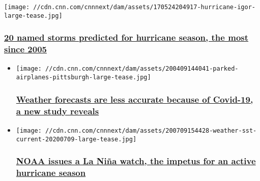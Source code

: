 \href{/2020/07/07/weather/hurricane-season-2020-forecast-update/index.html}{}

\texttt{[image: //cdn.cnn.com/cnnnext/dam/assets/170524204917-hurricane-igor-large-tease.jpg]}

\hypertarget{20-named-storms-predicted-for-hurricane-season-the-most-since-2005}{%
\subsubsection{\texorpdfstring{\href{/2020/07/07/weather/hurricane-season-2020-forecast-update/index.html}{20
named storms predicted for hurricane season, the most since
2005}}{20 named storms predicted for hurricane season, the most since 2005}}\label{20-named-storms-predicted-for-hurricane-season-the-most-since-2005}}

\begin{itemize}
\item
  \href{/2020/07/18/weather/fewer-flights-covid-weather-forecast-hurricane-impact/index.html}{}

  \texttt{[image: //cdn.cnn.com/cnnnext/dam/assets/200409144041-parked-airplanes-pittsburgh-large-tease.jpg]}

  \hypertarget{weather-forecasts-are-less-accurate-because-of-covid-19-a-new-study-reveals}{%
  \subsubsection{\texorpdfstring{\href{/2020/07/18/weather/fewer-flights-covid-weather-forecast-hurricane-impact/index.html}{Weather
  forecasts are less accurate because of Covid-19, a new study
  reveals}}{Weather forecasts are less accurate because of Covid-19, a new study reveals}}\label{weather-forecasts-are-less-accurate-because-of-covid-19-a-new-study-reveals}}
\item
  \href{/2020/07/09/weather/la-nia-2020-watch-noaa-forecast-hurricane/index.html}{}

  \texttt{[image: //cdn.cnn.com/cnnnext/dam/assets/200709154428-weather-sst-current-20200709-large-tease.jpg]}

  \hypertarget{noaa-issues-a-la-niuxf1a-watch-the-impetus-for-an-active-hurricane-season}{%
  \subsubsection{\texorpdfstring{\href{/2020/07/09/weather/la-nia-2020-watch-noaa-forecast-hurricane/index.html}{NOAA
  issues a La Niña watch, the impetus for an active hurricane
  season}}{NOAA issues a La Niña watch, the impetus for an active hurricane season}}\label{noaa-issues-a-la-niuxf1a-watch-the-impetus-for-an-active-hurricane-season}}
\end{itemize}

